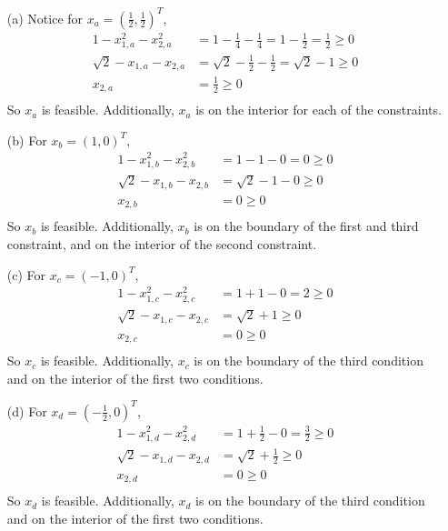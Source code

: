 \documentclass{article}
\begin{document}
\begin{itemize}
    \item[(a)] Notice for $x_a = (\frac{1}{2}, \frac{1}{2})^T$, 
    \begin{align*}
        1 - x_{1,a}^2 - x_{2,a}^2 &= 1 - \frac{1}{4} - \frac{1}{4} = 1 - \frac{1}{2} = \frac{1}{2} \geq 0 \\
        \sqrt{2} - x_{1,a} - x_{2,a} &= \sqrt{2} - \frac{1}{2} - \frac{1}{2} = \sqrt{2} - 1 \geq 0 \\
        x_{2,a} &= \frac{1}{2} \geq 0 \\
    \end{align*}
    So $x_a$ is feasible. Additionally, $x_a$ is on the interior for each of the constraints.
    


    \item[(b)] For $x_b = (1,0)^T$,
    \begin{align*}
        1 - x_{1,b}^2 - x_{2,b}^2 &= 1 - 1 - 0 = 0 \geq 0 \\
        \sqrt{2} - x_{1,b} - x_{2,b} &= \sqrt{2} - 1 - 0 \geq 0 \\
        x_{2,b} &= 0 \geq 0 \\
    \end{align*}
    So $x_b$ is feasible. Additionally, $x_b$ is on the boundary of the first and third constraint, and on the interior of the second constraint.


    \item[(c)] For $x_c = (-1,0)^T$,
    \begin{align*}
        1 - x_{1,c}^2 - x_{2,c}^2 &= 1 + 1 - 0 = 2 \geq 0 \\
        \sqrt{2} - x_{1,c} - x_{2,c} &= \sqrt{2} + 1 \geq 0 \\
        x_{2,c} &= 0 \geq 0 \\
    \end{align*}
    So $x_{c}$ is feasible. Additionally, $x_c$ is on the boundary of the third condition and on the interior of the first two conditions.
    


    \item[(d)] For $x_d = (-\frac{1}{2},0)^T$,
    \begin{align*}
        1 - x_{1,d}^2 - x_{2,d}^2 &= 1 + \frac{1}{2} - 0 = \frac{3}{2} \geq 0 \\
        \sqrt{2} - x_{1,d} - x_{2,d} &= \sqrt{2} + \frac{1}{2} \geq 0 \\
        x_{2,d} &= 0 \geq 0 \\
    \end{align*}
    So $x_d$ is feasible. Additionally, $x_d$ is on the boundary of the third condition and on the interior of the first two conditions.
    



\end{itemize}
\end{document}
